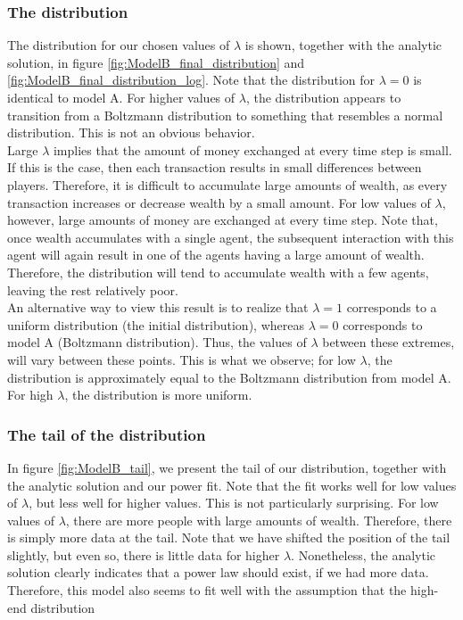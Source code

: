 \documentclass[a4paper, 10pt]{article}
\begin{document}
\subsubsection{The distribution}
The distribution for our chosen values of $\lambda$ is shown, together with the analytic solution, in figure \ref{fig:ModelB_final_distribution} and \ref{fig:ModelB_final_distribution_log}. Note that the distribution for $\lambda=0$ is identical to model A. For higher values of $\lambda$, the distribution appears to transition from a Boltzmann distribution to something that resembles a normal distribution. This is not an obvious behavior.\\
\linebreak
Large $\lambda$ implies that the amount of money exchanged at every time step is small. If this is the case, then each transaction results in small differences between players. Therefore, it is difficult to accumulate large amounts of wealth, as every transaction increases or decrease wealth by a small amount. For low values of $\lambda$, however, large amounts of money are exchanged at every time step. Note that, once wealth accumulates with a single agent, the subsequent interaction with this agent will again result in one of the agents having a large amount of wealth. Therefore, the distribution will tend to accumulate wealth with a few agents, leaving the rest relatively poor.\\
\linebreak
An alternative way to view this result is to realize that $\lambda=1$ corresponds to a uniform distribution (the initial distribution), whereas $\lambda=0$ corresponds to model A (Boltzmann distribution). Thus, the values of $\lambda$ between these extremes, will vary between these points. This is what we observe; for low $\lambda$, the distribution is approximately equal to the Boltzmann distribution from model A. For high $\lambda$, the distribution is more uniform. 
\subsubsection{The tail of the distribution}
In figure \ref{fig:ModelB_tail}, we present the tail of our distribution, together with the analytic solution and our power fit. Note that the fit works well for low values of $\lambda$, but less well for higher values. This is not particularly surprising. For low values of $\lambda$, there are more people with large amounts of wealth. Therefore, there is simply more data at the tail. Note that we have shifted the position of the tail slightly, but even so, there is little data for higher $\lambda$. Nonetheless, the analytic solution clearly indicates that a power law should exist, if we had more data. Therefore, this model also seems to fit well with the assumption that the high-end distribution 
\end{document}
